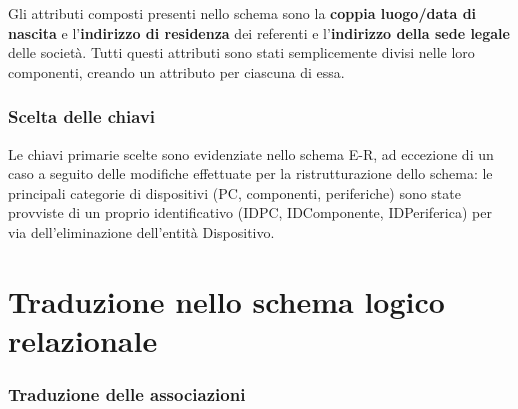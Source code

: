 \documentclass[a4paper,12pt]{report}
\begin{document}
Gli attributi composti presenti nello schema sono la \textbf{coppia luogo/data di nascita} e l'\textbf{indirizzo di residenza} dei referenti e l'\textbf{indirizzo della sede legale} delle società. Tutti questi attributi sono stati semplicemente divisi nelle loro componenti, creando un attributo per ciascuna di essa. 

\subsubsection*{Scelta delle chiavi}

Le chiavi primarie scelte sono evidenziate nello schema E-R, ad eccezione di un caso a seguito delle modifiche effettuate per la ristrutturazione dello schema: le principali categorie di dispositivi (PC, componenti, periferiche) sono state provviste di un proprio identificativo (IDPC, IDComponente, IDPeriferica) per via dell'eliminazione dell'entità Dispositivo.

\section{Traduzione nello schema logico relazionale}

\subsubsection*{Traduzione delle associazioni}
\end{document}
